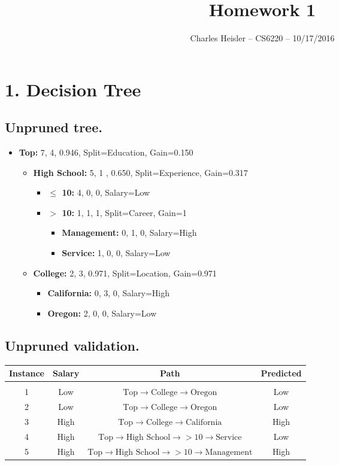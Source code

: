 \documentclass[12pt]{article}
\title{Homework 1}
\author{Charles Heisler -- CS6220 -- 10/17/2016}
\date{}
\begin{document}
	\maketitle

	\section*{1. Decision Tree}
	\subsection*{Unpruned tree.}
	\begin{itemize}
		\item[] \textbf{Top:} 7, 4, 0.946, Split=Education, Gain=0.150
		\begin{itemize}
			\item[] \textbf{High School:} 5, 1 , 0.650, Split=Experience, Gain=0.317
			\begin{itemize}
				\item[] \textbf{$\leq$ 10:} 4, 0, 0, Salary=Low
				\item[] \textbf{$>$ 10:} 1, 1, 1, Split=Career, Gain=1
				\begin{itemize}
					\item[] \textbf{Management:} 0, 1, 0, Salary=High
					\item[] \textbf{Service:} 1, 0, 0, Salary=Low
				\end{itemize}
			\end{itemize}
			\item[] \textbf{College:} 2, 3, 0.971, Split=Location, Gain=0.971
			\begin{itemize}
				\item[] \textbf{California:}  0, 3, 0, Salary=High
				\item[] \textbf{Oregon:} 2, 0, 0, Salary=Low
			\end{itemize}
		\end{itemize}
	\end{itemize}
	
	\subsection*{Unpruned validation.}
	\begin{tabular}{c | c | c | c}
		Instance & Salary & Path & Predicted \\
		\hline & & & \\
		1 & Low & $\textrm{Top}\rightarrow\textrm{College}\rightarrow\textrm{Oregon}$ & Low \\
		2 & Low & $\textrm{Top}\rightarrow\textrm{College}\rightarrow\textrm{Oregon}$ & Low \\
		3 & High & $\textrm{Top}\rightarrow\textrm{College}\rightarrow\textrm{California}$ & High \\
		4 & High & $\textrm{Top}\rightarrow\textrm{High School}\rightarrow>10\rightarrow\textrm{Service}$ & Low \\
		5 & High & $\textrm{Top}\rightarrow\textrm{High School}\rightarrow>10\rightarrow\textrm{Management}$ & High
	\end{tabular}
	
\end{document}
